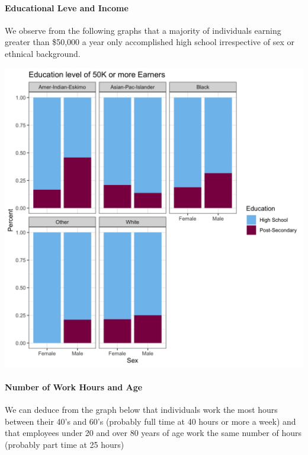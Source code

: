 \documentclass[]{article}
\let\oldparagraph\paragraph
\renewcommand{\paragraph}[1]{\oldparagraph{#1}\mbox{}}
\begin{document}
\hypertarget{educational-leve-and-income}{%
\paragraph{Educational Leve and
Income}\label{educational-leve-and-income}}

We observe from the following graphs that a majority of individuals
earning greater than \$50,000 a year only accomplished high school
irrespective of sex or ethnical background.

\includegraphics{../images/Plot_2_Education_Level_of_50K_or_more_Earners.png}

\hypertarget{number-of-work-hours-and-age}{%
\paragraph{Number of Work Hours and
Age}\label{number-of-work-hours-and-age}}

We can deduce from the graph below that individuals work the most hours
between their 40's and 60's (probably full time at 40 hours or more a
week) and that employees under 20 and over 80 years of age work the same
number of hours (probably part time at 25 hours)
\end{document}
